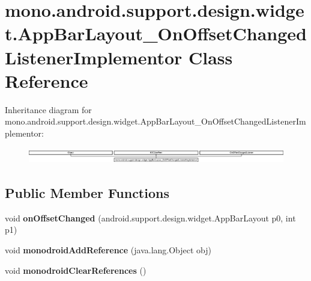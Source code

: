\hypertarget{classmono_1_1android_1_1support_1_1design_1_1widget_1_1_app_bar_layout___on_offset_changed_listener_implementor}{}\section{mono.\+android.\+support.\+design.\+widget.\+App\+Bar\+Layout\+\_\+\+On\+Offset\+Changed\+Listener\+Implementor Class Reference}
\label{classmono_1_1android_1_1support_1_1design_1_1widget_1_1_app_bar_layout___on_offset_changed_listener_implementor}
Inheritance diagram for mono.\+android.\+support.\+design.\+widget.\+App\+Bar\+Layout\+\_\+\+On\+Offset\+Changed\+Listener\+Implementor\+:\begin{figure}[H]
\begin{center}
\leavevmode
\includegraphics[height=0.704403cm]{classmono_1_1android_1_1support_1_1design_1_1widget_1_1_app_bar_layout___on_offset_changed_listener_implementor}
\end{center}
\end{figure}
\subsection*{Public Member Functions}
\begin{DoxyCompactItemize}
\item 
\mbox{\label{classmono_1_1android_1_1support_1_1design_1_1widget_1_1_app_bar_layout___on_offset_changed_listener_implementor_af1be42fc96cfda1bab1940dac3ed4b2c}} 
void {\bfseries on\+Offset\+Changed} (android.\+support.\+design.\+widget.\+App\+Bar\+Layout p0, int p1)
\item 
\mbox{\label{classmono_1_1android_1_1support_1_1design_1_1widget_1_1_app_bar_layout___on_offset_changed_listener_implementor_a94f7dac03362f2ea2f4b89d993e82cb6}} 
void {\bfseries monodroid\+Add\+Reference} (java.\+lang.\+Object obj)
\item 
\mbox{\label{classmono_1_1android_1_1support_1_1design_1_1widget_1_1_app_bar_layout___on_offset_changed_listener_implementor_a2bbedeb12ef96e9b75d0f95796625e8b}} 
void {\bfseries monodroid\+Clear\+References} ()
\end{DoxyCompactItemize}
